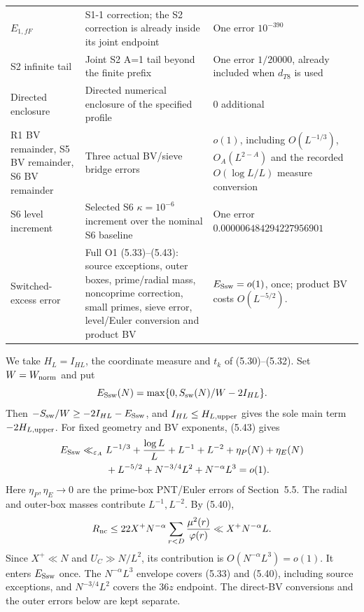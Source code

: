 \begin{longtable}{@{}p{}p{}p{}@{}}
$E_{1,fF}$ & S1-1 correction; the S2 correction is already inside its joint endpoint & One error $10^{-390}$ \\
S2 infinite tail & Joint S2 A=1 tail beyond the finite prefix & One error $1/20000$, already included when $d_{T8}$ is used \\
Directed enclosure & Directed numerical enclosure of the specified profile & $0$ additional \\
R1 BV remainder, S5 BV remainder, S6 BV remainder & Three actual BV/sieve bridge errors & $o(1)$, including $O(L^{-1/3})$, $O_A(L^{2-A})$ and the recorded $O(\log L/L)$ measure conversion \\
S6 level increment & Selected S6 $\kappa=10^{-6}$ increment over the nominal S6 baseline & One error $0.000006484294227956901$ \\
Switched-excess error & Full O1 (5.33)--(5.43): source exceptions, outer boxes, prime/radial mass, noncoprime correction, small primes, sieve error, level/Euler conversion and product BV & $E_{\rm Ssw}=o(1)$, once; product BV costs $O(L^{-5/2})$. \\
\end{longtable}
\endgroup

We take $H_L=I_{HL}$, the coordinate measure and $t_k$ of (5.30)--(5.32).
Set $W=W_{\rm norm}$ and put
\[
E_{\rm Ssw}(N)=\max\{0,S_{\rm sw}(N)/W-2I_{HL}\}.
\]
Then $-S_{\rm sw}/W\ge-2I_{HL}-E_{\rm Ssw}$, and
$I_{HL}\le H_{L,\rm upper}$ gives the sole main term $-2H_{L,\rm upper}$.
For fixed geometry and BV exponents, (5.43) gives
\[
\begin{split}
E_{\rm Ssw}\ll_{\varepsilon_A}{}&
L^{-1/3}+\frac{\log L}{L}+L^{-1}+L^{-2}
+\eta_P(N)+\eta_E(N)\\
&+L^{-5/2}+N^{-3/4}L^2+N^{-\alpha}L^3=o(1).
\end{split}
\]
Here $\eta_P,\eta_E\to0$ are the prime-box PNT/Euler errors of Section~5.5.
The radial and outer-box masses contribute $L^{-1},L^{-2}$.
By (5.40),
\[
R_{\rm nc}\le22X^+N^{-\alpha}\sum_{r<D}\frac{\mu^2(r)}{\varphi(r)}
\ll X^+N^{-\alpha}L.
\]
Since $X^+\ll N$ and $U_C\gg N/L^2$, its contribution is $O(N^{-\alpha}L^3)=o(1)$.
It enters $E_{\rm Ssw}$ once.
The $N^{-\alpha}L^3$ envelope covers (5.33) and (5.40), including source exceptions,
and $N^{-3/4}L^2$ covers the $36z$ endpoint.
The direct-BV conversions and the outer errors below are kept separate.

